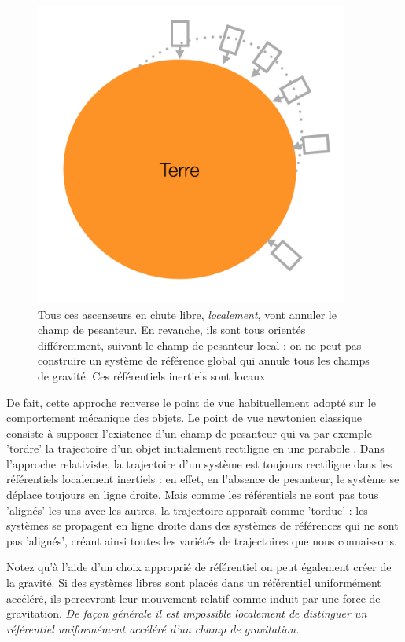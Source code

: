 \begin{figure}[htbp]
	\centering
		\includegraphics[height=10cm]{figs/ascradial.png}
	\caption[Référentiels localement inertiels]{Tous ces ascenseurs en chute libre, \textit{localement}, vont annuler le champ de pesanteur. En revanche, ils sont tous orientés différemment, suivant le champ de pesanteur local : on ne peut pas construire un système de référence global qui annule tous les champs de gravité. Ces référentiels inertiels sont locaux.}
	\label{f:ascradial}
\end{figure}

De fait, cette approche renverse le point de vue habituellement adopté sur le comportement mécanique des objets. Le point de vue newtonien classique consiste à supposer l'existence d'un champ de pesanteur qui va par exemple 'tordre' la trajectoire d'un objet initialement rectiligne en une parabole . Dans l'approche relativiste, la trajectoire d'un système est toujours rectiligne dans les référentiels localement inertiels : en effet, en l'absence de pesanteur, le système se déplace toujours en ligne droite. Mais comme les référentiels ne sont pas tous 'alignés' les uns avec les autres, la trajectoire apparaît comme 'tordue' : les systèmes se propagent en ligne droite dans des systèmes de références qui ne sont pas 'alignés', créant ainsi toutes les variétés de trajectoires que nous connaissons. 


Notez qu'à l'aide d'un choix approprié de référentiel on peut également créer de la gravité. Si des systèmes libres sont placés dans un référentiel uniformément accéléré, ils percevront leur mouvement relatif comme induit par une force de gravitation. \textit{De façon générale il est impossible localement de distinguer un référentiel uniformément accéléré d'un champ de gravitation.}


